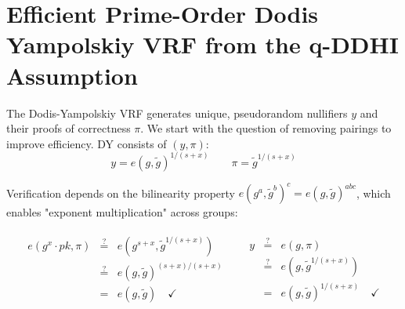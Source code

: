 







\section{Efficient Prime-Order Dodis Yampolskiy VRF from the q-DDHI Assumption}\label{sec:vrf-prime-order}

The Dodis-Yampolskiy \cite{hutchison_verifiable_2005} VRF generates unique, pseudorandom nullifiers $y$ and their proofs of correctness $\pi$. We start with the question of removing pairings to improve efficiency. DY consists of $(y, \pi)$:
\[
y = e(g, \tilde{g})^{1/(s+x)} \qquad \pi = \tilde{g}^{1/(s+x)}
\]

Verification depends on the bilinearity property $e(g^a, \tilde{g}^b)^c = e(g, \tilde{g})^{abc}$, which enables "exponent multiplication" across groups:

\begin{align*}
    \begin{array}{rcl}
    e(g^x \cdot pk, \pi) & \stackrel{?}{=} & e(g^{s+x}, \tilde{g}^{1/(s+x)}) \\
     & \stackrel{?}{=} & e(g, \tilde{g})^{(s+x)/(s+x)} \\
     & = & e(g, \tilde{g}) \quad \checkmark
    \end{array}
    &&
    \begin{array}{rcl}
    y & \stackrel{?}{=} & e(g, \pi) \\
     & \stackrel{?}{=} & e(g,\tilde{g}^{1/(s+x)}) \\
     & = & e(g, \tilde{g})^{1/(s+x)} \quad \checkmark
    \end{array}
\end{align*}


